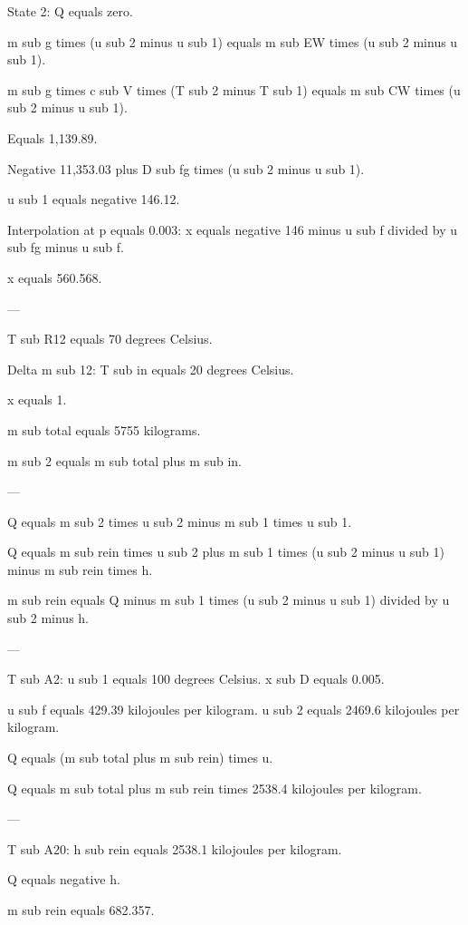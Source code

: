 State 2: Q equals zero.  

m sub g times (u sub 2 minus u sub 1) equals m sub EW times (u sub 2 minus u sub 1).  

m sub g times c sub V times (T sub 2 minus T sub 1) equals m sub CW times (u sub 2 minus u sub 1).  

Equals 1,139.89.  

Negative 11,353.03 plus D sub fg times (u sub 2 minus u sub 1).  

u sub 1 equals negative 146.12.  

Interpolation at p equals 0.003:  
x equals negative 146 minus u sub f divided by u sub fg minus u sub f.  

x equals 560.568.  

---

T sub R12 equals 70 degrees Celsius.  

Delta m sub 12:  
T sub in equals 20 degrees Celsius.  

x equals 1.  

m sub total equals 5755 kilograms.  

m sub 2 equals m sub total plus m sub in.  

---

Q equals m sub 2 times u sub 2 minus m sub 1 times u sub 1.  

Q equals m sub rein times u sub 2 plus m sub 1 times (u sub 2 minus u sub 1) minus m sub rein times h.  

m sub rein equals Q minus m sub 1 times (u sub 2 minus u sub 1) divided by u sub 2 minus h.  

---

T sub A2:  
u sub 1 equals 100 degrees Celsius.  
x sub D equals 0.005.  

u sub f equals 429.39 kilojoules per kilogram.  
u sub 2 equals 2469.6 kilojoules per kilogram.  

Q equals (m sub total plus m sub rein) times u.  

Q equals m sub total plus m sub rein times 2538.4 kilojoules per kilogram.  

---

T sub A20:  
h sub rein equals 2538.1 kilojoules per kilogram.  

Q equals negative h.  

m sub rein equals 682.357.